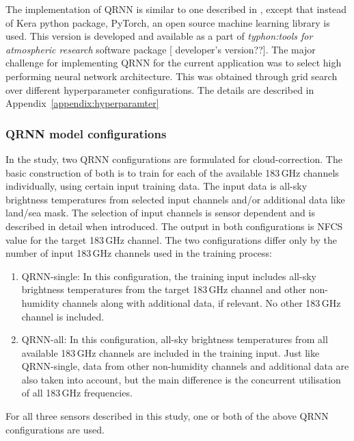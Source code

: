 \documentclass[amt]{copernicus}
\newcommand{\todo}[1]{{\color{red} #1}}
\begin{document}
The implementation of QRNN is similar to one described in \citet{pfreundschuh:aneur:18}, except that instead of Kera python package, PyTorch, an open source machine learning
library \citep{paszke2017automatic} is used. This version is developed and available as a part of \textit{typhon:tools for atmospheric research} software package [\todo{developer's version??}]. The major challenge for implementing QRNN for the current application was to select high performing neural network architecture. This was obtained through grid search over different hyperparameter configurations. The details are described in Appendix~\ref{appendix:hyperparamter}

\subsubsection{QRNN model configurations}
%
In the study, two QRNN configurations are formulated for cloud-correction. The basic construction of both is to train for each of the available 183\,GHz channels individually, using certain input training data. The input data is all-sky brightness temperatures from selected input channels and/or additional data like land/sea mask. The selection of input channels is sensor dependent and is described in detail when introduced. The output in both configurations is NFCS value for the target 183\,GHz channel. The two configurations differ only by the number of input 183\,GHz channels used in the training process:

\begin{enumerate}
	\item QRNN-single: In this configuration, the training input includes all-sky brightness temperatures from the target 183\,GHz channel and other non-humidity channels along with additional data, if relevant. No other 183\,GHz channel is included.  
	
	\item QRNN-all: In this configuration, all-sky brightness temperatures from all available 183\,GHz channels are included in the training input. Just like QRNN-single, data from other non-humidity channels and additional data are also taken into account, but the main difference is the concurrent utilisation of all 183\,GHz frequencies.      
\end{enumerate}

For all three sensors described in this study, one or both of the above QRNN configurations are used. 
\end{document}
